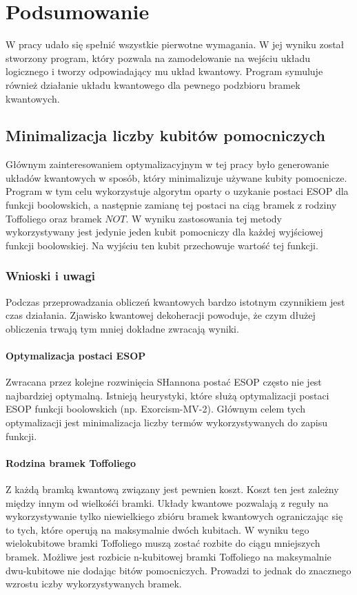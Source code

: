 \chapter{Podsumowanie}
\thispagestyle{chapterBeginStyle}
W pracy udało się spełnić wszystkie pierwotne wymagania. W jej wyniku został stworzony program, który pozwala na zamodelowanie na wejściu układu logicznego i tworzy odpowiadający mu układ kwantowy. Program symuluje również działanie układu kwantowego dla pewnego podzbioru bramek kwantowych.
\section{Minimalizacja liczby kubitów pomocniczych}
Głównym zainteresowaniem optymalizacyjnym w tej pracy było generowanie układów kwantowych w sposób, który minimalizuje używane kubity pomocnicze. Program w tym celu wykorzystuje algorytm oparty o uzykanie postaci ESOP dla funkcji boolowskich, a następnie zamianę tej postaci na ciąg bramek z rodziny Toffoliego oraz bramek $NOT$. W wyniku zastosowania tej metody wykorzystywany jest jedynie jeden kubit pomocniczy dla każdej wyjściowej funkcji boolowskiej. Na wyjściu ten kubit przechowuje wartość tej funkcji.
\subsection{Wnioski i uwagi}
Podczas przeprowadzania obliczeń kwantowych bardzo istotnym czynnikiem jest czas działania. Zjawisko kwantowej dekoheracji powoduje, że czym dłużej obliczenia trwają tym mniej dokładne zwracają wyniki.
\subsubsection{Optymalizacja postaci ESOP}
Zwracana przez kolejne rozwinięcia SHannona postać ESOP często nie jest najbardziej optymalną. Istnieją heurystyki, które służą optymalizacji postaci ESOP funkcji boolowskich (np. Exorcism-MV-2). Głównym celem tych optymalizacji jest minimalizacja liczby termów wykorzystywanych do zapisu funkcji.
\subsubsection{Rodzina bramek Toffoliego}
Z każdą bramką kwantową związany jest pewnien koszt. Koszt ten jest zależny między innym od wielkośći bramki. Układy kwantowe pozwalają z reguły na wykorzystywanie tylko niewielkiego zbióru bramek kwantowych ograniczając się to tych, które operują na maksymalnie dwóch kubitach. W wyniku tego wielokubitowe bramki Toffoliego muszą zostać rozbite do ciągu mniejszych bramek. Możliwe jest rozbicie n-kubitowej bramki Toffoliego na maksymalnie dwu-kubitowe  nie dodając bitów pomocniczych. Prowadzi to jednak do znacznego wzrostu iczby wykorzystywanych bramek.
